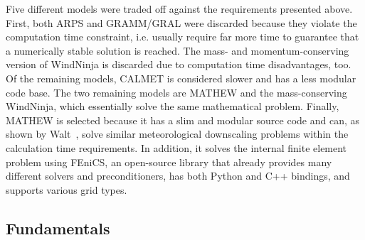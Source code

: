 \documentclass[twocolumn,letterpaper]{IEEEAerospaceCLS}
\begin{document}
Five different models were traded off against the requirements presented above. First, both ARPS and GRAMM/GRAL were discarded because they violate the computation time constraint, i.e. usually require far more time to guarantee that a numerically stable solution is reached. The mass- and momentum-conserving version of WindNinja is discarded due to computation time disadvantages, too. Of the remaining models, CALMET is considered slower and has a less modular code base. The two remaining models are MATHEW and the mass-conserving WindNinja, which essentially solve the same mathematical problem. Finally, MATHEW is selected because it has a slim and modular source code and can, as shown by Walt~\cite{Walt2016}, solve similar meteorological downscaling problems within the calculation time requirements. In addition, it solves the internal finite element problem using FEniCS, an open-source library that already provides many different solvers and preconditioners, has both Python and C++ bindings, and supports various grid types.

\subsection{Fundamentals}
\label{sec:PL_WindPred_Fundamentals}

\end{document}
